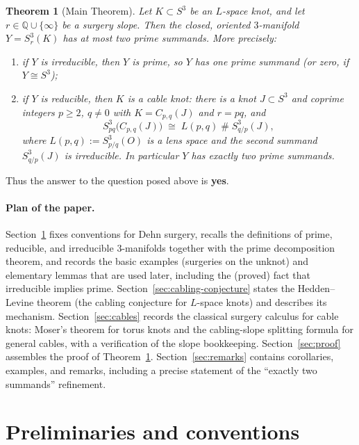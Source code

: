 \documentclass[11pt]{article}
\newtheorem{theorem}{Theorem}[section]
\theoremstyle{definition}
\theoremstyle{remark}
\numberwithin{equation}{section}
\begin{document}
\begin{theorem}[Main Theorem]\label{thm:main-intro}
Let $K\subset S^{3}$ be an $L$-space knot, and let $r\in\mathbb{Q}\cup\{\infty\}$
be a surgery slope.  Then the closed, oriented $3$-manifold
$Y=S^{3}_{r}(K)$ has at most two prime summands.  More precisely:
\begin{enumerate}
\item[(i)] if $Y$ is irreducible, then $Y$ is prime, so $Y$ has one prime
summand (or zero, if $Y\cong S^{3}$);
\item[(ii)] if $Y$ is reducible, then $K$ is a cable knot: there is a knot
$J\subset S^{3}$ and coprime integers $p\ge 2$, $q\neq 0$ with
$K=C_{p,q}(J)$ and $r=pq$, and
\[
S^{3}_{pq}\bigl(C_{p,q}(J)\bigr)\;\cong\;L(p,q)\;\#\;S^{3}_{q/p}(J),
\]
where $L(p,q):=S^{3}_{p/q}(O)$ is a lens space and the second summand
$S^{3}_{q/p}(J)$ is irreducible.  In particular $Y$ has exactly two prime
summands.
\end{enumerate}
\end{theorem}

Thus the answer to the question posed above is \textbf{yes}.

\paragraph{Plan of the paper.}
Section~\ref{sec:prelim} fixes conventions for Dehn surgery, recalls the
definitions of prime, reducible, and irreducible $3$-manifolds together
with the prime decomposition theorem, and records the basic examples
(surgeries on the unknot) and elementary lemmas that are used later,
including the (proved) fact that irreducible implies prime.
Section~\ref{sec:cabling-conjecture} states the Hedden--Levine theorem
(the cabling conjecture for $L$-space knots) and describes its mechanism.
Section~\ref{sec:cables} records the classical surgery calculus for cable
knots: Moser's theorem for torus knots and the cabling-slope splitting
formula for general cables, with a verification of the slope bookkeeping.
Section~\ref{sec:proof} assembles the proof of
Theorem~\ref{thm:main-intro}.  Section~\ref{sec:remarks} contains
corollaries, examples, and remarks, including a precise statement of the
``exactly two summands'' refinement.

\section{Preliminaries and conventions}\label{sec:prelim}
\end{document}
